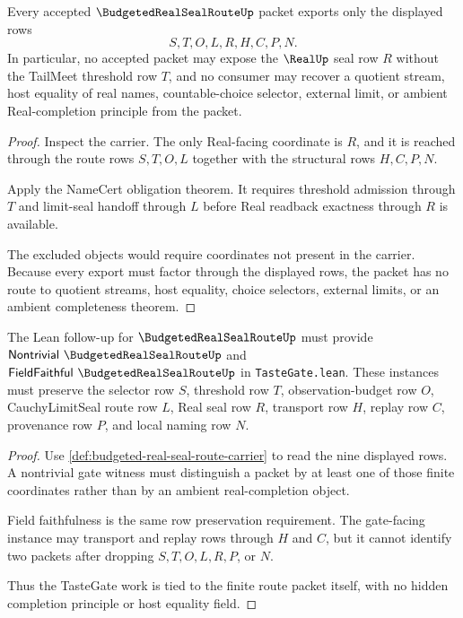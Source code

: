 \begin{theorem}
\label{thm:budgeted-real-seal-route-nonescape}
Every accepted $\BudgetedRealSealRouteUp$ packet exports only the displayed rows
$$
S,T,O,L,R,H,C,P,N.
$$
In particular, no accepted packet may expose the $\RealUp$ seal row $R$ without the TailMeet threshold row $T$, and no consumer may recover a quotient stream, host equality of real names, countable-choice selector, external limit, or ambient Real-completion principle from the packet.
\end{theorem}
\begin{proof}
Inspect the carrier. The only Real-facing coordinate is $R$, and it is reached through the route rows $S,T,O,L$ together with the structural rows $H,C,P,N$.

Apply the NameCert obligation theorem. It requires threshold admission through $T$ and limit-seal handoff through $L$ before Real readback exactness through $R$ is available.

The excluded objects would require coordinates not present in the carrier. Because every export must factor through the displayed rows, the packet has no route to quotient streams, host equality, choice selectors, external limits, or an ambient completeness theorem.
\end{proof}

\begin{theorem}
\label{thm:budgeted-real-seal-route-tastegate-obligation}
The Lean follow-up for $\BudgetedRealSealRouteUp$ must provide $\mathsf{Nontrivial}\ \BudgetedRealSealRouteUp$ and $\mathsf{FieldFaithful}\ \BudgetedRealSealRouteUp$ in \texttt{TasteGate.lean}. These instances must preserve the selector row $S$, threshold row $T$, observation-budget row $O$, CauchyLimitSeal route row $L$, Real seal row $R$, transport row $H$, replay row $C$, provenance row $P$, and local naming row $N$.
\end{theorem}
\begin{proof}
Use \autoref{def:budgeted-real-seal-route-carrier} to read the nine displayed rows. A nontrivial gate witness must distinguish a packet by at least one of those finite coordinates rather than by an ambient real-completion object.

Field faithfulness is the same row preservation requirement. The gate-facing instance may transport and replay rows through $H$ and $C$, but it cannot identify two packets after dropping $S,T,O,L,R,P$, or $N$.

Thus the TasteGate work is tied to the finite route packet itself, with no hidden completion principle or host equality field.
\end{proof}

